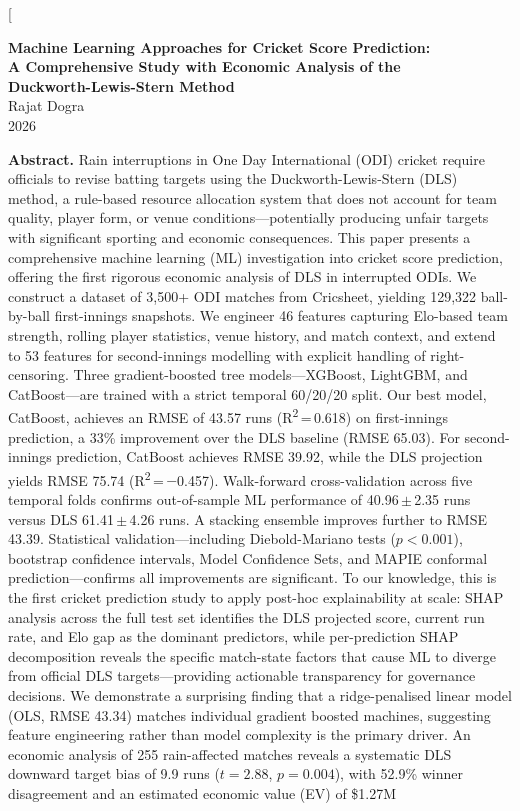 \documentclass[10pt,a4paper,twocolumn]{article}
\begin{document}
\twocolumn[{%
\begin{center}
{\LARGE \bfseries Machine Learning Approaches for Cricket Score Prediction:\\
A Comprehensive Study with Economic Analysis of the\\
Duckworth-Lewis-Stern Method}\\[1em]
{\large Rajat Dogra}\\[0.3em]
{\normalsize 2026}\\[1.5em]
\end{center}

\begin{center}
\begin{minipage}{0.88\textwidth}
\textbf{Abstract.}
Rain interruptions in One Day International (ODI) cricket require officials to revise batting targets using the Duckworth-Lewis-Stern (DLS) method, a rule-based resource allocation system that does not account for team quality, player form, or venue conditions---potentially producing unfair targets with significant sporting and economic consequences. This paper presents a comprehensive machine learning (ML) investigation into cricket score prediction, offering the first rigorous economic analysis of DLS in interrupted ODIs. We construct a dataset of 3,500+ ODI matches from Cricsheet, yielding 129,322 ball-by-ball first-innings snapshots. We engineer 46 features capturing Elo-based team strength, rolling player statistics, venue history, and match context, and extend to 53 features for second-innings modelling with explicit handling of right-censoring. Three gradient-boosted tree models---XGBoost, LightGBM, and CatBoost---are trained with a strict temporal 60/20/20 split. Our best model, CatBoost, achieves an RMSE of 43.57 runs (R\textsuperscript{2}\,=\,0.618) on first-innings prediction, a 33\% improvement over the DLS baseline (RMSE 65.03). For second-innings prediction, CatBoost achieves RMSE 39.92, while the DLS projection yields RMSE 75.74 (R\textsuperscript{2}\,=\,$-$0.457). Walk-forward cross-validation across five temporal folds confirms out-of-sample ML performance of 40.96\,$\pm$\,2.35 runs versus DLS 61.41\,$\pm$\,4.26 runs. A stacking ensemble improves further to RMSE 43.39. Statistical validation---including Diebold-Mariano tests ($p < 0.001$), bootstrap confidence intervals, Model Confidence Sets, and MAPIE conformal prediction---confirms all improvements are significant. To our knowledge, this is the first cricket prediction study to apply post-hoc explainability at scale: SHAP analysis across the full test set identifies the DLS projected score, current run rate, and Elo gap as the dominant predictors, while per-prediction SHAP decomposition reveals the specific match-state factors that cause ML to diverge from official DLS targets---providing actionable transparency for governance decisions. We demonstrate a surprising finding that a ridge-penalised linear model (OLS, RMSE 43.34) matches individual gradient boosted machines, suggesting feature engineering rather than model complexity is the primary driver. An economic analysis of 255 rain-affected matches reveals a systematic DLS downward target bias of 9.9 runs ($t=2.88$, $p=0.004$), with 52.9\% winner disagreement and an estimated economic value (EV) of \$1.27M 
\end{minipage}
\end{center}}
\end{document}

